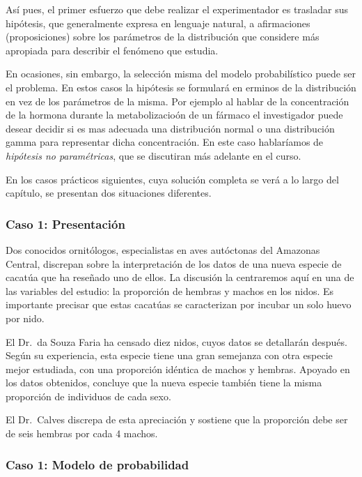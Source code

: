 \documentclass[
]{article}
\begin{document}
Así pues, el primer esfuerzo que debe realizar el experimentador es trasladar sus hipótesis, que generalmente expresa en lenguaje natural, a afirmaciones (proposiciones) sobre los parámetros de la distribución que considere más apropiada para describir el fenómeno que estudia.

En ocasiones, sin embargo, la selección misma del modelo probabilístico puede ser el problema. En estos casos la hipótesis se formulará en erminos de la distribución en vez de los parámetros de la misma. Por ejemplo al hablar de la concentración de la hormona durante la metabolizacioón de un fármaco el investigador puede desear decidir si es mas adecuada una distribución normal o una distribución gamma para representar dicha concentración. En este caso hablaríamos de \emph{hipótesis no paramétricas}, que se discutiran más adelante en el curso.

En los casos prácticos siguientes, cuya solución completa se verá a lo largo del capítulo, se presentan dos situaciones diferentes.

\subsubsection{Caso 1: Presentación}\label{caso-1-presentaciuxf3n}

Dos conocidos ornitólogos, especialistas en aves autóctonas del Amazonas Central, discrepan sobre la interpretación de los datos de una nueva especie de cacatúa que ha reseñado uno de ellos. La discusión la centraremos aquí en una de las variables del estudio: la proporción de hembras y machos en los nidos. Es importante precisar que estas cacatúas se caracterizan por incubar un solo huevo por nido.

El Dr.~da Souza Faria ha censado diez nidos, cuyos datos se detallarán después. Según su experiencia, esta especie tiene una gran semejanza con otra especie mejor estudiada, con una proporción idéntica de machos y hembras. Apoyado en los datos obtenidos, concluye que la nueva especie también tiene la misma proporción de individuos de cada sexo.

El Dr.~Calves discrepa de esta apreciación y sostiene que la proporción debe ser de seis hembras por cada 4 machos.

\subsubsection{Caso 1: Modelo de probabilidad}\label{caso-1-modelo-de-probabilidad}
\end{document}
